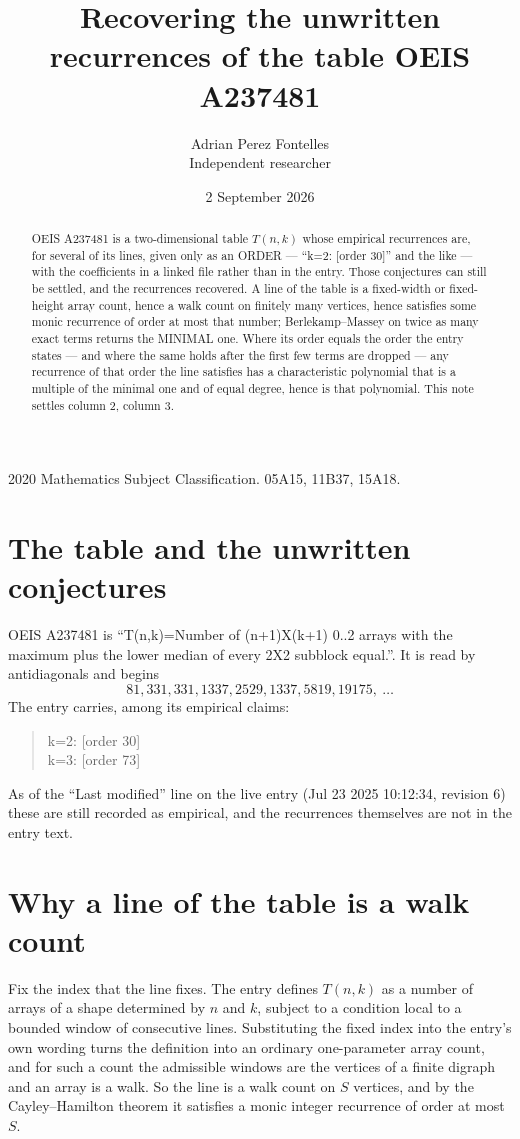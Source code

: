 \documentclass[11pt,a4paper]{article}
\title{Recovering the unwritten recurrences of the table OEIS A237481}
\author{Adrian Perez Fontelles\\ \small Independent researcher}
\date{2 September 2026}
\theoremstyle{plain}
\theoremstyle{definition}
\begin{document}
\maketitle

\begin{abstract}
OEIS A237481 is a two-dimensional table $T(n,k)$ whose empirical recurrences are, for several of
its lines, given only as an ORDER --- ``k=2: [order 30]'' and the like --- with the
coefficients in a linked file rather than in the entry. Those conjectures can still be settled,
and the recurrences recovered. A line of the table is a fixed-width or fixed-height array
count, hence a walk count on finitely many vertices, hence satisfies some monic recurrence of
order at most that number; Berlekamp--Massey on twice as many exact terms returns the MINIMAL
one. Where its order equals the order the entry states --- and where the same holds after the
first few terms are dropped --- any recurrence of that order the line satisfies has a
characteristic polynomial that is a multiple of the minimal one and of equal degree, hence is
that polynomial. This note settles column 2, column 3.
\end{abstract}

\noindent\small 2020 Mathematics Subject Classification. 05A15, 11B37, 15A18.\normalsize

\section{The table and the unwritten conjectures}

OEIS A237481 is ``T(n,k)=Number of (n+1)X(k+1) 0..2 arrays with the maximum plus the lower median of every 2X2 subblock equal.''. It is read by antidiagonals and begins
\[
81, 331, 331, 1337, 2529, 1337, 5819, 19175,\ \dots
\]
The entry carries, among its empirical claims:
\begin{quote}\small
k=2: [order 30]\\
k=3: [order 73]
\end{quote}
As of the ``Last modified'' line on the live entry (Jul 23 2025 10:12:34, revision 6) these are still
recorded as empirical, and the recurrences themselves are not in the entry text.

\section{Why a line of the table is a walk count}

Fix the index that the line fixes. The entry defines $T(n,k)$ as a number of arrays of a shape
determined by $n$ and $k$, subject to a condition local to a bounded window of consecutive
lines. Substituting the fixed index into the entry's own wording turns the definition into an
ordinary one-parameter array count, and for such a count the admissible windows are the
vertices of a finite digraph and an array is a walk. So the line is a walk count on $S$
vertices, and by the Cayley--Hamilton theorem it satisfies a monic integer recurrence of order
at most $S$.
\end{document}
